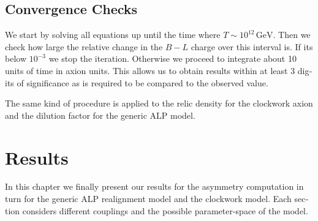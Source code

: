 \documentclass[master,       %
               twoside,        %
               BCOR10mm,       %
               english,ngerman, %
               ]{GAUBM}
\begin{document}
\begin{otherlanguage}{english}
\section{Convergence Checks}
We start by solving all equations up until the time where $T \sim 10^{12} \, \mathrm{GeV}$.
Then we check how large the relative change in the $B - L$ charge over this interval is. If its below $10^{-3}$  we stop the iteration. Otherwise we proceed to integrate about 10 units of time in axion units. This allows us to obtain results within at least 3 digits of significance as is required to be compared to the observed value.

The same kind of procedure is applied to the relic density for the clockwork axion and the dilution factor for the generic ALP model.

\chapter{Results}
\label{sec:results}
In this chapter we finally present our results for the asymmetry computation in turn for the generic ALP realignment model and the clockwork model.
Each section considers different couplings and the possible parameter-space of the model.


\end{otherlanguage}
\end{document}
